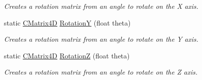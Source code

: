 \begin{DoxyCompactItemize}
\begin{DoxyCompactList}\small\item\em Creates a rotation matrix from an angle to rotate on the X axis. \end{DoxyCompactList}\item 
static \hyperlink{struct_c_matrix4_d}{C\+Matrix4D} \hyperlink{struct_c_matrix4_d_aa064ea29a986a87412ee90202fbb90fe}{RotationY} (float theta)
\begin{DoxyCompactList}\small\item\em Creates a rotation matrix from an angle to rotate on the Y axis. \end{DoxyCompactList}\item 
static \hyperlink{struct_c_matrix4_d}{C\+Matrix4D} \hyperlink{struct_c_matrix4_d_acad3bc9ba0a3f581795d01cc43a6e91a}{RotationZ} (float theta)
\begin{DoxyCompactList}\small\item\em Creates a rotation matrix from an angle to rotate on the Z axis. \end{DoxyCompactList}\end{DoxyCompactItemize}
